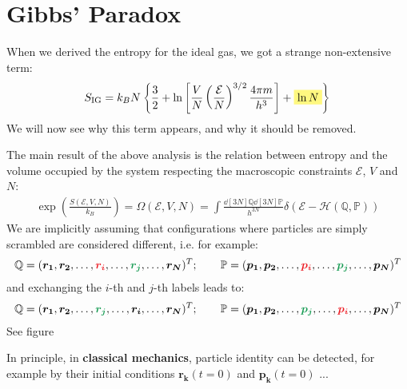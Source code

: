 \documentclass[../template.tex]{subfiles}
\begin{document}
\section{Gibbs' Paradox}

When we derived the entropy for the ideal gas, we got a strange non-extensive term:
\begin{align}
    S_{\mathrm{IG}} = k_B N \left\{\frac{3}{2} + \ln\left[\frac{V}{N} \left(\frac{\mathcal{E}}{N} \right)^{3/2} \frac{4 \pi m}{h^3}  \right] + \hlc{Yellow}{\ln N} \right\} \label{eqn:78}
\end{align}
We will now see why this term appears, and why it should be removed.

\medskip

The main result of the above analysis is the relation between entropy and the volume occupied by the system respecting the macroscopic constraints $\mathcal{E}$, $V$ and $N$:
\begin{align}\label{eqn:75}
    \exp\left(\frac{S(\mathcal{E}, V, N)}{k_B} \right) = \Omega(\mathcal{E}, V, N) = \int \frac{\dd[3N]{\mathbb{Q}} \dd[3N]{\mathbb{P}}}{h^{3N}} \delta(\mathcal{E}- \mathcal{H}(\mathbb{Q},\mathbb{P})) 
\end{align}
We are implicitly assuming that configurations where particles are simply scrambled are considered different, i.e. for example:
\begin{align*}
    \mathbb{Q}=(\bm{r_1}, \bm{r_2}, \dots, \textcolor{Red}{\bm{r_i}}, \dots, \textcolor{ForestGreen}{\bm{r_j}}, \dots, \bm{r_N})^T; \qquad \mathbb{P}=(\bm{p_1}, \bm{p_2}, \dots, \textcolor{Red}{\bm{p_i}}, \dots, \textcolor{ForestGreen}{\bm{p_j}}, \dots, \bm{p_N})^T
\end{align*}
and exchanging the $i$-th and $j$-th labels leads to:
\begin{align*}
    \mathbb{Q}=(\bm{r_1}, \bm{r_2}, \dots, \textcolor{ForestGreen}{\bm{r_j}} \textcolor{Red}{}, \dots,\bm{r_i}, \dots, \bm{r_N})^T; \qquad \mathbb{P}=(\bm{p_1}, \bm{p_2}, \dots,\textcolor{ForestGreen}{\bm{p_j}} , \dots,\textcolor{Red}{\bm{p_i}} , \dots, \bm{p_N})^T
\end{align*}
See figure %

\medskip

In principle, in \textbf{classical mechanics}, particle identity can be detected, for example by their initial conditions $\bm{r_k}(t=0)$ and $\bm{p_k}(t=0)$ ...
\end{document}
